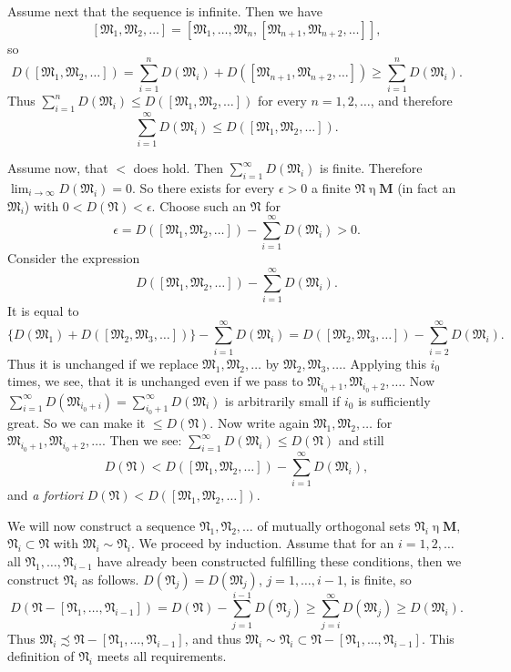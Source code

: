 \documentclass[12pt,b5paper,twoside]{article}
\newcommand{\M}{\mathbf M}
\begin{document}
Assume next that the sequence is infinite. Then we have
\[
 [\mathfrak M_1,\mathfrak M_2,\ldots]
 =[\mathfrak M_1,\ldots,\mathfrak M_n,
   [\mathfrak M_{n+1},\mathfrak M_{n+2},\ldots]],
\]
so
\[
 D([\mathfrak M_1,\mathfrak M_2,\ldots])
 =\sum_{i=1}^nD(\mathfrak M_i)
 +D([\mathfrak M_{n+1},\mathfrak M_{n+2},\ldots])
 \geq\sum_{i=1}^nD(\mathfrak M_i).
\]
Thus
$\sum_{i=1}^nD(\mathfrak M_i)\leq D([\mathfrak M_1,\mathfrak M_2,\ldots])$
for every $n=1,2,\ldots$, and therefore
\[
 \sum_{i=1}^\infty D(\mathfrak M_i)
 \leq D([\mathfrak M_1,\mathfrak M_2,\ldots]).
\]

Assume now, that $<$ does hold. Then $\sum_{i=1}^\infty D(\mathfrak M_i)$ is
finite. Therefore $\lim_{i\to\infty}D(\mathfrak M_i)=0$. So there exists for
every $\epsilon>0$ a finite $\mathfrak N\mathbin\eta\M$ (in fact an
$\mathfrak M_i$) with $0<D(\mathfrak N)<\epsilon$. Choose such an
$\mathfrak N$ for
\[
 \epsilon=D([\mathfrak M_1,\mathfrak M_2,\ldots])
 -\sum_{i=1}^\infty D(\mathfrak M_i)>0.
\]
Consider the expression
\[
 D([\mathfrak M_1,\mathfrak M_2,\ldots])
 -\sum_{i=1}^\infty D(\mathfrak M_i).
\]
It is equal to
\[
 \{D(\mathfrak M_1)+D([\mathfrak M_2,\mathfrak M_3,\ldots])\}
 -\sum_{i=1}^\infty D(\mathfrak M_i)
 =D([\mathfrak M_2,\mathfrak M_3,\ldots])
 -\sum_{i=2}^\infty D(\mathfrak M_i).
\]
Thus it is unchanged if we replace
$\mathfrak M_1,\mathfrak M_2,\ldots$ by
$\mathfrak M_2,\mathfrak M_3,\ldots$. Applying this $i_0$ times, we see, that
it is unchanged even if we pass to
$\mathfrak M_{i_0+1},\mathfrak M_{i_0+2},\ldots$. Now
$\sum_{i=1}^\infty D(\mathfrak M_{i_0+i})=
\sum_{i_0+1}^\infty D(\mathfrak M_i)$ is arbitrarily small if $i_0$ is
sufficiently great. So we can make it $\leq D(\mathfrak N)$. Now write again
$\mathfrak M_1,\mathfrak M_2,\ldots$ for
$\mathfrak M_{i_0+1},\mathfrak M_{i_0+2},\ldots$. Then we see:
$\sum_{i=1}^\infty D(\mathfrak M_i)\leq D(\mathfrak N)$ and still
\[
 D(\mathfrak N)<D([\mathfrak M_1,\mathfrak M_2,\ldots])
 -\sum_{i=1}^\infty D(\mathfrak M_i),
\]
and \emph{a fortiori}
$D(\mathfrak N)<D([\mathfrak M_1,\mathfrak M_2,\ldots])$.

We will now construct a sequence $\mathfrak N_1,\mathfrak N_2,\ldots$ of
mutually orthogonal sets $\mathfrak N_i\mathbin\eta\M$,
$\mathfrak N_i\subset\mathfrak N$ with $\mathfrak M_i\sim\mathfrak N_i$. We
proceed by induction. Assume that for an $i=1,2,\ldots$ all
$\mathfrak N_1,\ldots,\mathfrak N_{i-1}$ have already been constructed
fulfilling these conditions, then we construct $\mathfrak N_i$ as follows.
$D(\mathfrak N_j)=D(\mathfrak M_j)$, $j=1,\ldots,i-1$, is finite, so
\[
 D(\mathfrak N-[\mathfrak N_1,\ldots,\mathfrak N_{i-1}])
 =D(\mathfrak N)-\sum_{j=1}^{i-1}D(\mathfrak N_j)
 \geq\sum_{j=i}^\infty D(\mathfrak M_j)
 \geq D(\mathfrak M_i).
\]
Thus
$\mathfrak M_i\precsim
\mathfrak N-[\mathfrak N_1,\ldots,\mathfrak N_{i-1}]$, and thus
$\mathfrak M_i\sim\mathfrak N_i\subset
\mathfrak N-[\mathfrak N_1,\ldots,\mathfrak N_{i-1}]$. This definition of
$\mathfrak N_i$ meets all requirements.
\end{document}
